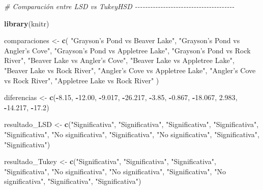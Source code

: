 \documentclass[
]{article}
\newenvironment{Shaded}{\begin{snugshade}}{\end{snugshade}}
\newcommand{\CommentTok}[1]{\textcolor[rgb]{0.56,0.35,0.01}{\textit{#1}}}
\newcommand{\FloatTok}[1]{\textcolor[rgb]{0.00,0.00,0.81}{#1}}
\newcommand{\FunctionTok}[1]{\textcolor[rgb]{0.13,0.29,0.53}{\textbf{#1}}}
\newcommand{\NormalTok}[1]{#1}
\newcommand{\OtherTok}[1]{\textcolor[rgb]{0.56,0.35,0.01}{#1}}
\newcommand{\SpecialCharTok}[1]{\textcolor[rgb]{0.81,0.36,0.00}{\textbf{#1}}}
\newcommand{\StringTok}[1]{\textcolor[rgb]{0.31,0.60,0.02}{#1}}
\begin{document}
\begin{Shaded}
\begin{Highlighting}[]
\CommentTok{\# Comparación entre LSD vs TukeyHSD {-}{-}{-}{-}{-}{-}{-}{-}{-}{-}{-}{-}{-}{-}{-}{-}{-}{-}{-}{-}{-}{-}{-}{-}{-}{-}{-}{-}{-}{-}{-}{-}{-}{-}{-}{-}{-}{-}{-}}

\FunctionTok{library}\NormalTok{(knitr)}

\NormalTok{comparaciones }\OtherTok{\textless{}{-}} \FunctionTok{c}\NormalTok{(}
  \StringTok{"Grayson’s Pond vs Beaver Lake"}\NormalTok{,}
  \StringTok{"Grayson’s Pond vs Angler’s Cove"}\NormalTok{,}
  \StringTok{"Grayson’s Pond vs Appletree Lake"}\NormalTok{,}
  \StringTok{"Grayson’s Pond vs Rock River"}\NormalTok{,}
  \StringTok{"Beaver Lake vs Angler’s Cove"}\NormalTok{,}
  \StringTok{"Beaver Lake vs Appletree Lake"}\NormalTok{,}
  \StringTok{"Beaver Lake vs Rock River"}\NormalTok{,}
  \StringTok{"Angler’s Cove vs Appletree Lake"}\NormalTok{,}
  \StringTok{"Angler’s Cove vs Rock River"}\NormalTok{,}
  \StringTok{"Appletree Lake vs Rock River"}
\NormalTok{)}

\NormalTok{diferencias }\OtherTok{\textless{}{-}} \FunctionTok{c}\NormalTok{(}\SpecialCharTok{{-}}\FloatTok{8.15}\NormalTok{, }\SpecialCharTok{{-}}\FloatTok{12.00}\NormalTok{, }\SpecialCharTok{{-}}\FloatTok{9.017}\NormalTok{, }\SpecialCharTok{{-}}\FloatTok{26.217}\NormalTok{, }\SpecialCharTok{{-}}\FloatTok{3.85}\NormalTok{, }\SpecialCharTok{{-}}\FloatTok{0.867}\NormalTok{, }\SpecialCharTok{{-}}\FloatTok{18.067}\NormalTok{, }\FloatTok{2.983}\NormalTok{, }\SpecialCharTok{{-}}\FloatTok{14.217}\NormalTok{, }\SpecialCharTok{{-}}\FloatTok{17.2}\NormalTok{)}

\NormalTok{resultado\_LSD }\OtherTok{\textless{}{-}} \FunctionTok{c}\NormalTok{(}\StringTok{"Significativa"}\NormalTok{, }\StringTok{"Significativa"}\NormalTok{, }\StringTok{"Significativa"}\NormalTok{, }\StringTok{"Significativa"}\NormalTok{,}
                   \StringTok{"Significativa"}\NormalTok{, }\StringTok{"No significativa"}\NormalTok{, }\StringTok{"Significativa"}\NormalTok{,}
                   \StringTok{"No significativa"}\NormalTok{, }\StringTok{"Significativa"}\NormalTok{, }\StringTok{"Significativa"}\NormalTok{)}

\NormalTok{resultado\_Tukey }\OtherTok{\textless{}{-}} \FunctionTok{c}\NormalTok{(}\StringTok{"Significativa"}\NormalTok{, }\StringTok{"Significativa"}\NormalTok{, }\StringTok{"Significativa"}\NormalTok{, }\StringTok{"Significativa"}\NormalTok{,}
                     \StringTok{"No significativa"}\NormalTok{, }\StringTok{"No significativa"}\NormalTok{, }\StringTok{"Significativa"}\NormalTok{,}
                     \StringTok{"No significativa"}\NormalTok{, }\StringTok{"Significativa"}\NormalTok{, }\StringTok{"Significativa"}\NormalTok{)}


\end{Highlighting}
\end{Shaded}
\end{document}
